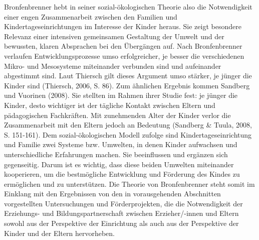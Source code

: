 \documentclass[12pt,a4paper]{article}
\begin{document}
	Bronfenbrenner hebt in seiner sozial-ökologischen Theorie also die Notwendigkeit einer engen Zusammenarbeit zwischen den Familien und Kindertageseinrichtungen im Interesse der Kinder heraus. Sie zeigt besondere Relevanz einer intensiven gemeinsamen Gestaltung der Umwelt und der bewussten, klaren Absprachen bei den Übergängen auf. Nach Bronfenbrenner verlaufen Entwicklungsprozesse umso erfolgreicher, je besser die verschiedenen Mikro- und Mesosysteme miteinander verbunden sind und aufeinander abgestimmt sind. Laut Thiersch gilt dieses Argument umso stärker, je jünger die Kinder sind (Thiersch, 2006, S. 86). Zum ähnlichen Ergebnis kommen Sandberg und Vuorinen (2008). Sie stellten im Rahmen ihrer Studie fest: je jünger die Kinder, desto wichtiger ist der tägliche Kontakt zwischen Eltern und pädagogischen Fachkräften. Mit zunehmenden Alter der Kinder verlor die Zusammenarbeit mit den Eltern jedoch an Bedeutung (Sandberg \& Tuula, 2008, S. 151-161).
	Dem sozial-ökologischen Modell zufolge sind Kindertageseinrichtung und Familie zwei Systeme bzw. Umwelten, in denen Kinder aufwachsen und unterschiedliche Erfahrungen machen. Sie beeinflussen und ergänzen sich gegenseitig. Darum ist es wichtig, dass diese beiden Umwelten miteinander kooperieren, um die bestmögliche Entwicklung und Förderung des Kindes zu ermöglichen und zu unterstützen. 
Die Theorie von Bronfenbrenner steht somit im Einklang mit den Ergebnissen von den in vorausgehenden Abschnitten vorgestellten Untersuchungen und Förderprojekten, die die Notwendigkeit der Erziehungs- und Bildungspartnerschaft zwischen Erzieher/-innen und Eltern sowohl aus der Perspektive der Einrichtung als auch aus der Perspektive der Kinder und der Eltern hervorheben.
\end{document}
